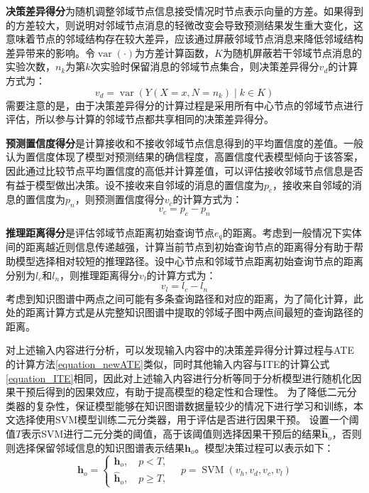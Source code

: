 \documentclass[algorithmlist, AutoFakeBold, AutoFakeSlant, figurelist, tablelist, nomlist, engineering]{seuthesix}
\begin{document}
\textbf{决策差异得分}为随机调整邻域节点信息接受情况时节点表示向量的方差。如果得到的方差较大，则说明对邻域节点消息的轻微改变会导致预测结果发生重大变化，这意味着节点的邻域结构存在较大差异，应该通过屏蔽邻域节点消息来降低邻域结构差异带来的影响。令$\operatorname{var}(\cdot)$为方差计算函数，$K$为随机屏蔽若干邻域节点消息的实验次数，$n_k$为第$k$次实验时保留消息的邻域节点集合，则决策差异得分$v_d$的计算方式为：
\begin{equation}
  v_d = \operatorname{var}(Y(X=x, N=n_k) \mid k \in K)
  \label{get2}
\end{equation}
需要注意的是，由于决策差异得分的计算过程是采用所有中心节点的邻域节点进行评估，所以参与计算的邻域节点都共享相同的决策差异得分。

\textbf{预测置信度得分}是计算接收和不接收邻域节点信息得到的平均置信度的差值。一般认为置信度体现了模型对预测结果的确信程度，高置信度代表模型倾向于该答案，因此通过比较节点平均置信度的高低并计算差值，可以评估接收邻域节点信息是否有益于模型做出决策。设不接收来自邻域的消息的置信度为$p_c$，接收来自邻域的消息的置信度为$p_n$，则预测置信度得分$v_c$的计算方式为：
\begin{equation}
  v_c = p_c - p_n
  \label{get3}
\end{equation}

\textbf{推理距离得分}是评估邻域节点距离初始查询节点$e_q$的距离。考虑到一般情况下实体间的距离越近则信息传递越强，计算当前节点到初始查询节点的距离得分有助于帮助模型选择相对较短的推理路径。设中心节点和邻域节点距离初始查询节点的距离分别为$l_c$和$l_n$，则推理距离得分$v_l$的计算方式为：
\begin{equation}
  v_l = l_c - l_n
  \label{get4}
\end{equation}
考虑到知识图谱中两点之间可能有多条查询路径和对应的距离，为了简化计算，此处的距离计算方式是从完整知识图谱中提取的邻域子图中两点间最短的查询路径的距离。

对上述输入内容进行分析，可以发现输入内容中的决策差异得分计算过程与ATE的计算方法\ref{equation_newATE}类似，同时其他输入内容与ITE的计算公式\ref{equation_ITE}相同，因此对上述输入内容进行分析等同于分析模型进行随机化因果干预后得到的因果效应，有助于提高模型的稳定性和合理性。
为了降低二元分类器的复杂性，保证模型能够在知识图谱数据量较少的情况下进行学习和训练，本文选择使用SVM模型训练二元分类器，用于评估是否进行因果干预。
设置一个阈值$T$表示SVM进行二元分类的阈值，高于该阈值则选择因果干预后的结果$\bm{\hat{h}}_o$，否则则选择保留邻域信息的知识图谱表示结果$\bm{h}_o$。模型决策过程可以表示如下：
\begin{equation}
  \bm{h}_o = \left\{\begin{array}{l}
  \bm{h}_o,\quad p < T, \\
  \bm{\hat{h}}_o,\quad p \geq T,
  \end{array} \quad p = \operatorname{SVM}\left(v_h, v_d, v_c, v_l\right)\right.
  \label{equation_SVM}
\end{equation}
\end{document}
